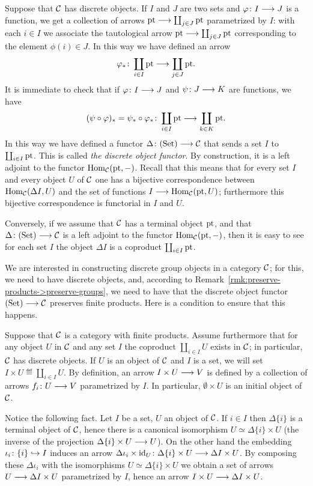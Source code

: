 \begin{2   CONTRAVARIANT FUNCTORS}
\begin{2.2 Group objects}
Suppose that $\mathcal{C}$ has discrete objects. If $I$ and $J$ are two sets and $\phi \colon I \arr J$ is a function, we get a collection of arrows $\pt \arr \coprod_{j \in J} \pt$ parametrized by $I$: with each $i \in I$ we associate the tautological arrow $\pt \arr \coprod_{j \in J} \pt$ corresponding to the element $\phi(i) \in J$. In this way we have defined an arrow
   \[
   \phi_* \colon \coprod_{i \in I}\pt \arr
   \coprod_{j \in J}\pt.
   \]
It is immediate to check that if $\phi \colon I \arr J$ and $\psi \colon J \arr K$ are functions, we have
   \[
   (\psi \circ \phi)_* = \psi_* \circ \phi_* \colon 
   \coprod_{i \in I}\pt \arr \coprod_{k \in K}\pt.
   \]
In this way we have defined a functor $\Delta \colon \catset \arr
\cC$ that sends a set $I$ to $\coprod_{i \in I} \mathrm{pt}$. This is called \emph{the discrete object functor}. By construction, it is a left adjoint to the functor $\operatorname{Hom}_{\mathcal{C}}(\mathrm{pt}, -)$. Recall that this means that for every set $I$ and every object $U$ of $\mathcal{C}$ one has a bijective correspondence between $\operatorname{Hom}_{\mathcal{C}}(\Delta I, U)$ and the set of functions $I \arr \hom_{\cC}(\pt, U)$; furthermore this bijective correspondence is functorial in $I$ and $U$.

Conversely, if we assume that $\mathcal{C}$ has a terminal object $\mathrm{pt}$, and that $\Delta \colon \catset \arr \cC$ is a left adjoint to the functor $\operatorname{Hom}_{\mathcal{C}}(\mathrm{pt}, -)$, then it is easy to see for each set $I$ the object $\Delta I$ is a coproduct $\coprod_{i \in I} \mathrm{pt}$.

We are interested in constructing discrete group objects in a category $\mathcal{C}$; for this, we need to have discrete objects, and, according to Remark~\ref{rmk:preserve-products->preserve-groups}, we need to have that the discrete object functor $\catset \arr \cC$ preserves finite products. Here is a condition to ensure that this happens.

Suppose that $\mathcal{C}$ is a category with finite products. Assume furthermore that for any object $U$ in $\mathcal{C}$ and any set $I$ the coproduct $\coprod_{i \in I} U$ exists in $\mathcal{C}$; in particular, $\mathcal{C}$ has discrete objects.  If $U$ is an object of $\mathcal{C}$ and $I$ is a set, we will set $I \times U \eqdef \coprod_{i \in I}U$. By definition, an arrow $I \times U \arr V$ is defined by a collection of arrows $f_i \colon U \arr V$ parametrized by $I$. In particular, $\emptyset \times U$ is an initial object of $\mathcal{C}$.

Notice the following fact. Let $I$ be a set, $U$ an object of 
$\mathcal{C}$. If $i \in I$ then $\Delta\{i\}$ is a terminal object of $\mathcal{C}$, hence there is a canonical isomorphism $U \simeq \Delta\{i\} \times U$ (the inverse of the projection $\Delta \{i\} \times U \arr U$). On the other hand the embedding $\iota_i \colon \{i\} \hookrightarrow I$ induces an arrow $\Delta\iota_i \times \id_U \colon \Delta\{i\} \times U \arr \Delta I \times U$. By composing these $\Delta\iota_i$ with the isomorphisms $U \simeq \Delta\{i\} \times U$ we obtain a set of arrows $U \arr \Delta I \times U$ parametrized by $I$, hence an arrow $I \times U \arr \Delta I \times U$.


\end{2.2 Group objects}
\end{2   CONTRAVARIANT FUNCTORS}
